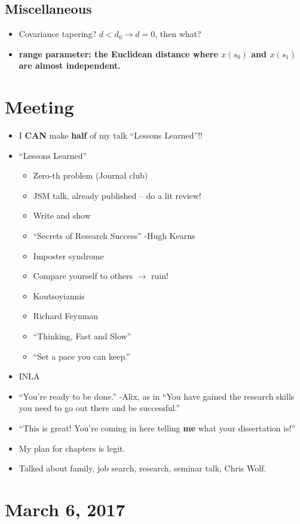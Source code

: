 \documentclass{article}
\begin{document}
\subsection*{Miscellaneous}
\begin{itemize}
\item Covariance tapering? $d < d_{0} \rightarrow d = 0$, then what?
\item {\bf range parameter: the Euclidean distance where $x(s_{0})$ and $x(s_{1})$ are almost independent.} \citep{Lindgren2011}
\end{itemize}

\section*{Meeting}
\begin{itemize}
\item I {\bf CAN} make {\bf half} of my talk ``Lessons Learned''!!
\item ``Lessons Learned'' 
  \begin{itemize}
  \item Zero-th problem (Journal club)
  \item JSM talk, already published -- do a lit review!
  \item Write and show
  \item ``Secrets of Research Success'' -Hugh Kearns
  \item Imposter syndrome
  \item Compare yourself to others $\rightarrow$ ruin!
  \item Koutsoyiannis
  \item Richard Feynman
  \item ``Thinking, Fast and Slow''
  \item ``Set a pace you can keep.''
  \end{itemize}
\item INLA
\item ``You're ready to be done.'' -Alix, as in ``You have gained the research skills you need to go out there and be successful.''
\item ``This is great! You're coming in here telling {\bf  me} what your dissertation is!''
\item My plan for chapters is legit.
\item Talked about family, job search, research, seminar talk, Chris Wolf.
\end{itemize}

\section*{March 6, 2017}
\end{document}
